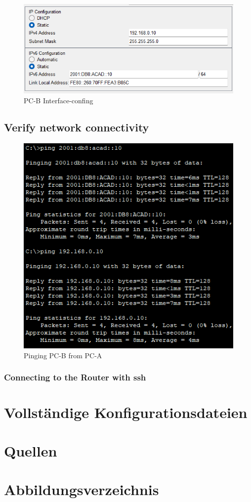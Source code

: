 \documentclass[a4paper]{article}
\begin{document}
\begin{figure}[h]
	\centering
	\includegraphics[scale=0.3]{images/pc-b-fa.png}
	\caption{PC-B Interface-confing}
\end{figure}

\subsection{Verify network connectivity}
\begin{figure}[h]
	\centering
	\includegraphics[scale=0.3]{images/ping.png}
	\caption{Pinging PC-B from PC-A}
\end{figure}
\subsubsection{Connecting to the Router with ssh}


\subsection{}
\section{Vollständige Konfigurationsdateien}

\newpage

\section{Quellen}

\newpage
\section{Abbildungsverzeichnis}

\listoffigures
\end{document}
